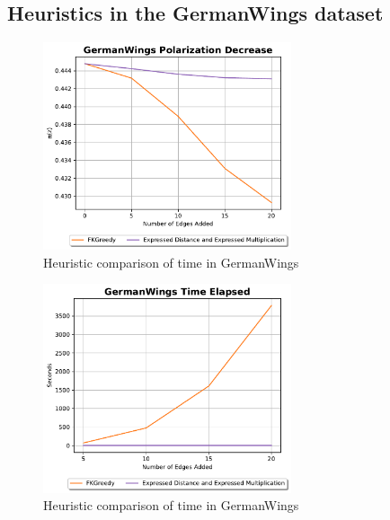 \clearpage

\subsection{Heuristics in the GermanWings dataset}

\begin{figure}[!htbp]
	\centering
	\includegraphics[width=0.65\textwidth]{Figures/GermanWings Polarization Decrease}
	\caption{Heuristic comparison of time in GermanWings}
	\label{fig:GermanWings_pol}
\end{figure}


\begin{figure}[!htbp]
	\centering
	\includegraphics[width=0.65\textwidth]{Figures/GermanWings Time Elapsed}
	\caption{Heuristic comparison of time in GermanWings}
	\label{fig:GermanWings_time}
\end{figure}
\clearpage


